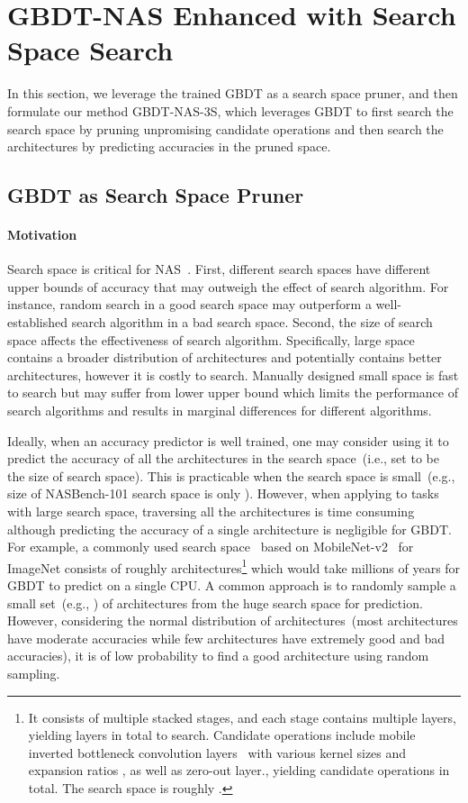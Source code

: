 \documentclass{article}
\begin{document}
\section{GBDT-NAS Enhanced with Search Space Search}
In this section, we leverage the trained GBDT as a search space pruner, and then formulate our method GBDT-NAS-3S, which leverages GBDT to first search the search space by pruning unpromising candidate operations and then search the architectures by predicting accuracies in the pruned space.

\subsection{GBDT as Search Space Pruner}
\paragraph{Motivation}
Search space is critical for NAS~\cite{random,rdarts}. First, different search spaces have different upper bounds of accuracy that may outweigh the effect of search algorithm. For instance, random search in a good search space may outperform a well-established search algorithm in a bad search space. Second, the size of search space affects the effectiveness of search algorithm. Specifically, large space contains a broader distribution of architectures and potentially contains better architectures, however it is costly to search. Manually designed small space is fast to search but may suffer from lower upper bound which limits the performance of search algorithms and results in marginal differences for different algorithms.

Ideally, when an accuracy predictor is well trained, one may consider using it to predict the accuracy of all the architectures in the search space~(i.e., set  to be the size of search space). This is practicable when the search space is small~(e.g., size of NASBench-101 search space is only ). However, when applying to tasks with large search space, traversing all the architectures is time consuming although predicting the accuracy of a single architecture is negligible for GBDT. For example, a commonly used search space~\cite{proxylessnas,neuralpredictor} based on MobileNet-v2~\cite{mobilenetv2} for ImageNet consists of roughly  architectures\footnote{It consists of multiple stacked stages, and each stage contains multiple layers, yielding  layers in total to search. Candidate operations include mobile inverted bottleneck convolution layers~\cite{mobilenetv2} with various kernel sizes  and expansion ratios , as well as zero-out layer., yielding  candidate operations in total. The search space is roughly .} which would take millions of years for GBDT to predict on a single CPU. A common approach is to randomly sample a small set~(e.g., ) of architectures from the huge search space for prediction. However, considering the normal distribution of architectures~(most architectures have moderate accuracies while few architectures have extremely good and bad accuracies), it is of low probability to find a good architecture using random sampling. 
\end{document}
